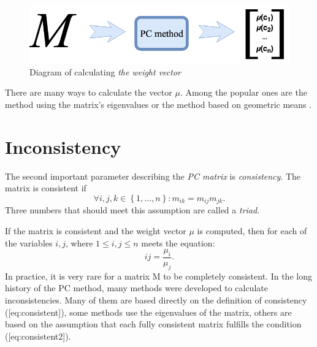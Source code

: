 \begin{figure}[ht]
\centerline{\includegraphics[scale=2.5]{fig1.png}}
\caption{Diagram of calculating \textit{the weight vector}}
\label{fig:fig1}
\end{figure}

There are many ways to calculate the vector $\mu$. Among the popular ones are the method using the matrix's eigenvalues or the method based on geometric means \cite{SAATY1998}.

\section{Inconsistency}
\label{subsec:inconsistency}
The second important parameter describing the \textit{PC matrix} is \textit{consistency}. The matrix is consistent if 
	\begin{equation} 
		\forall i,j,k \in\left\{ 1,\ldots,n\right\} :m_{ik}=m_{ij}m_{jk}.
	\end{equation}
Three numbers that should meet this assumption are called a \textit{triad}.

If the matrix is consistent and the weight vector $\mu$ is computed, then for each of the variables $i,j$, where $1\leq i,j\leq n$ meets the equation: 
	\begin{equation} 
		{ij}=\frac{\mu_{i}}{\mu_{j}}.
 	\end{equation}
In practice, it is very rare for a matrix M to be completely consistent. In the long history of the PC method, many methods were developed to calculate inconsistencies. Many of them are based directly on the definition of consistency ([eq:consistent]), some methods use the eigenvalues of the matrix, others are based on the assumption that each fully consistent matrix fulfills the condition ([eq:consistent2]).